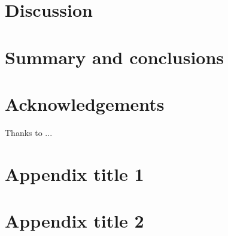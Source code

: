 \documentclass[final,5p,times,twocolumn]{elsarticle}
\begin{document}
\section{Discussion}
\lipsum[4]

\section{Summary and conclusions}
\lipsum[1-4]


\section*{Acknowledgements}
Thanks to ...

\appendix

\section{Appendix title 1}

\section{Appendix title 2}


% 
% 
%  
% 







\end{document}
